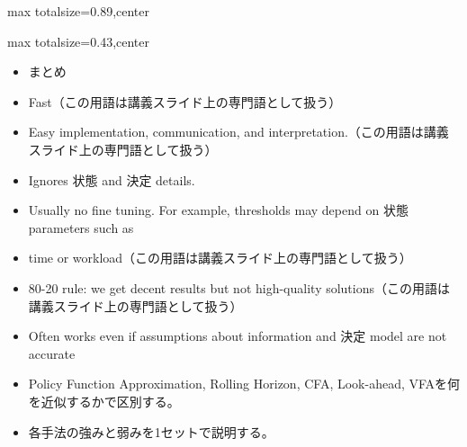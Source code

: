 \begin{minipage}[t]{0.58\textwidth}
\begin{adjustbox}{max totalsize={\textwidth}{0.89\textheight},center}
\begin{minipage}{\textwidth}
\end{minipage}
\end{adjustbox}
\end{minipage}


\clearpage
{}
\begin{minipage}[t]{0.405\textwidth}
\begin{adjustbox}{max totalsize={\textwidth}{0.43\textheight},center}
\begin{minipage}{\textwidth}\scriptsize
{}\begin{itemize}
\item まとめ
\item Fast（この用語は講義スライド上の専門語として扱う）
\item Easy implementation, communication, and interpretation.（この用語は講義スライド上の専門語として扱う）
\item Ignores 状態 and 決定 details.
\item Usually no fine tuning. For example, thresholds may depend on 状態 parameters such as
\item time or workload（この用語は講義スライド上の専門語として扱う）
\item 80-20 rule: we get decent results but not high-quality solutions（この用語は講義スライド上の専門語として扱う）
\item Often works even if assumptions about information and 決定 model are not accurate
\end{itemize}\begin{itemize}
\item Policy Function Approximation, Rolling Horizon, CFA, Look-ahead, VFAを何を近似するかで区別する。
\item 各手法の強みと弱みを1セットで説明する。
\end{itemize}
\end{minipage}
\end{adjustbox}
\end{minipage}\hfill
